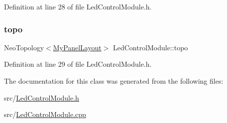 Definition at line 28 of file Led\+Control\+Module.\+h.

\mbox{\label{class_led_control_module_a0b71b57d3f564529c89be8877dbfaa6b}} 
\subsubsection{\texorpdfstring{topo}{topo}}
{\footnotesize\ttfamily Neo\+Topology$<$\mbox{\hyperlink{_led_control_module_8h_a49b2323848e516b3241e758de64f0b3b}{My\+Panel\+Layout}}$>$ Led\+Control\+Module\+::topo\hspace{0.3cm}{\ttfamily [private]}}



Definition at line 29 of file Led\+Control\+Module.\+h.



The documentation for this class was generated from the following files\+:\begin{DoxyCompactItemize}
\item 
src/\mbox{\hyperlink{_led_control_module_8h}{Led\+Control\+Module.\+h}}\item 
src/\mbox{\hyperlink{_led_control_module_8cpp}{Led\+Control\+Module.\+cpp}}\end{DoxyCompactItemize}
